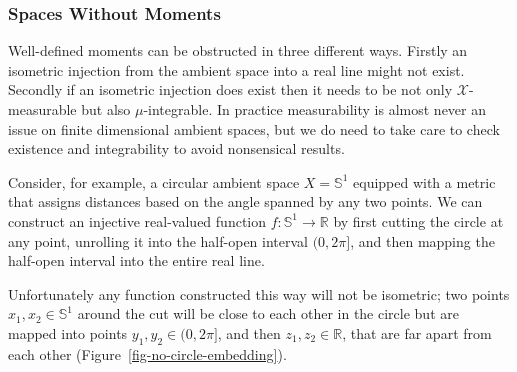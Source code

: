 \documentclass[
  letterpaper,
  DIV=11,
  numbers=noendperiod]{scrartcl}
\begin{document}
\hypertarget{spaces-without-moments}{%
\subsubsection{Spaces Without Moments}\label{spaces-without-moments}}

Well-defined moments can be obstructed in three different ways. Firstly
an isometric injection from the ambient space into a real line might not
exist. Secondly if an isometric injection does exist then it needs to be
not only \(\mathcal{X}\)-measurable but also \(\mu\)-integrable. In
practice measurability is almost never an issue on finite dimensional
ambient spaces, but we do need to take care to check existence and
integrability to avoid nonsensical results.

Consider, for example, a circular ambient space \(X = \mathbb{S}^{1}\)
equipped with a metric that assigns distances based on the angle spanned
by any two points. We can construct an injective real-valued function
\(f : \mathbb{S}^{1} \rightarrow \mathbb{R}\) by first cutting the
circle at any point, unrolling it into the half-open interval
\((0, 2 \pi]\), and then mapping the half-open interval into the entire
real line.

Unfortunately any function constructed this way will not be isometric;
two points \(x_{1}, x_{2} \in \mathbb{S}^{1}\) around the cut will be
close to each other in the circle but are mapped into points
\(y_{1}, y_{2} \in (0, 2 \pi]\), and then
\(z_{1}, z_{2} \in \mathbb{R}\), that are far apart from each other
(Figure~\ref{fig-no-circle-embedding}).
\end{document}
